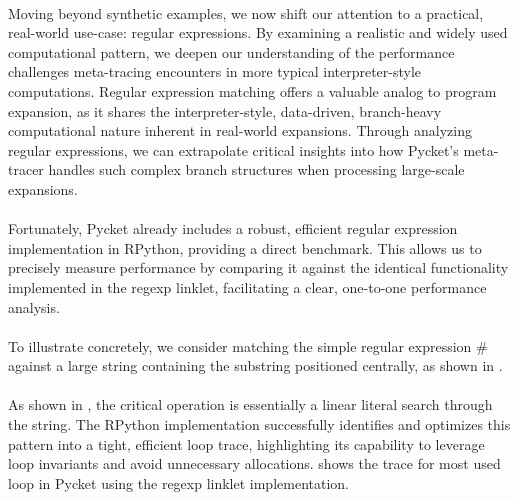 
			\paragraph{}%
				Moving beyond synthetic examples, we now shift our attention to a practical, real-world use-case: regular expressions. By examining a realistic and widely used computational pattern, we deepen our understanding of the performance challenges meta-tracing encounters in more typical interpreter-style computations. Regular expression matching offers a valuable analog to program expansion, as it shares the interpreter-style, data-driven, branch-heavy computational nature inherent in real-world expansions. Through analyzing regular expressions, we can extrapolate critical insights into how Pycket's meta-tracer handles such complex branch structures when processing large-scale expansions.

			\paragraph{}%
				Fortunately, Pycket already includes a robust, efficient regular expression implementation in RPython, providing a direct benchmark. This allows us to precisely measure performance by comparing it against the identical functionality implemented in the regexp linklet, facilitating a clear, one-to-one performance analysis.



			\paragraph{}%
				To illustrate concretely, we consider matching the simple regular expression $\mathtt{\#}$ against a large string containing the substring  positioned centrally, as shown in .


			\paragraph{}%
				As shown in , the critical operation is essentially a linear literal search through the string. The RPython implementation successfully identifies and optimizes this pattern into a tight, efficient loop trace, highlighting its capability to leverage loop invariants and avoid unnecessary allocations.  shows the trace for most used loop in Pycket using the regexp linklet implementation.

